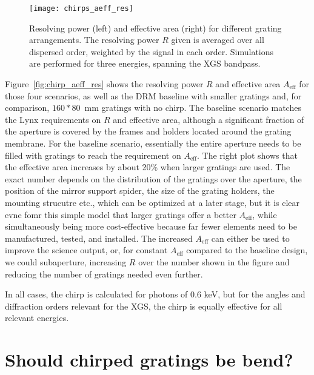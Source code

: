 \documentclass[]{spie}  %
\begin{document}
\begin{figure} [ht]
\begin{center}
\texttt{[image: chirps\_aeff\_res]}
\end{center}
\caption {\label{fig:chirps_aeff_res}
 Resolving power (left) and effective area (right) for different grating arrangements. The resolving power $R$ given is averaged over all dispersed order, weighted by the signal in each order. Simulations are performed for three energies, spanning the XGS bandpass. 
}
\end{figure}

Figure~\ref{fig:chirp_aeff_res} shows the resolving power $R$ and effective area $A_{\mathrm{eff}}$ for those four scenarios, as well as the DRM baseline with smaller gratings and, for comparison, $160 * 80$~mm gratings with no chirp. 
The baseline scenario matches the Lynx requirements on $R$ and effective area, although a significant fraction of the aperture is covered by the frames and holders located around the grating membrane. For the baseline scenario, essentially the entire aperture needs to be filled with gratings to reach the requirement on $A_{\mathrm{eff}}$. The right plot shows that the effective area increases by about 20\% when larger gratings are used. The exact number depends on the distribution of the gratings over the aperture, the position of the mirror support spider, the size of the grating holders, the mounting strucutre etc., which can be optimized at a later stage, but it is clear evne fomr this simple model that larger gratings offer a better $A_{\mathrm{eff}}$, while simultaneously being more cost-effective because far fewer elements need to be manufactured, tested, and installed. The increased $A_{\mathrm{eff}}$ can either be used to improve the science output, or, for constant $A_{\mathrm{eff}}$ compared to the baseline design, we could subaperture, increasing $R$ over the number shown in the figure and reducing the number of gratings needed even further. 

In all cases, the chirp is calculated for photons of 0.6 keV, but for the angles and diffraction orders relevant for the XGS, the chirp is equally effective for all relevant energies.


\section{Should chirped gratings be bend?}
\label{sect:bend}
\end{document}
